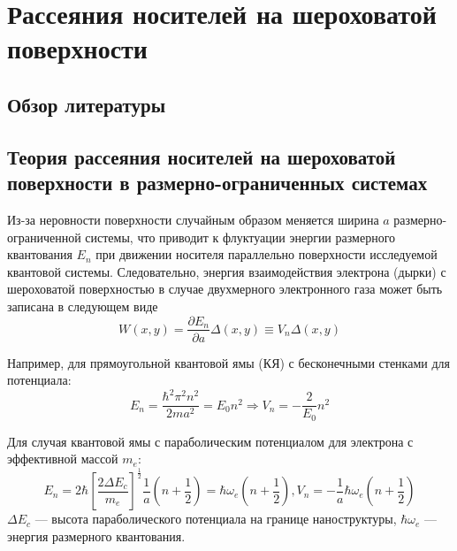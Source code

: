 \chapter{Рассеяния носителей на шероховатой поверхности} \label{chapt1}

\section{Обзор литературы} \label{sect1_1}

\section{Теория рассеяния носителей на шероховатой поверхности в размерно-ограниченных системах} \label{sect1_2}
Из-за неровности поверхности случайным образом меняется ширина $a$ размерно-ограниченной системы, что приводит к флуктуации энергии размерного квантования $E_n$ при движении носителя параллельно поверхности исследуемой квантовой системы. Следовательно, энергия взаимодействия электрона (дырки) с шероховатой поверхностью в случае двухмерного электронного газа может быть записана в следующем виде \cite{Sakaki1987}
\begin{equation}
W(x,y)=\frac{\partial E_n}{\partial a}\Delta(x,y)\equiv V_n \Delta(x,y)
\end{equation}

Например, для прямоугольной квантовой ямы (КЯ) с бесконечными стенками для потенциала:
\begin{equation}
E_n = \frac{\hbar^2 \pi^2 n^2}{2ma^2}=E_0 n^2 \Rightarrow V_n = -\frac{2}{E_0}n^2
\end{equation}

Для случая квантовой ямы с параболическим потенциалом для электрона с эффективной массой $m_e$:
\begin{equation}
E_n=2\hbar \left[ \frac{2\Delta E_c} {m_e} \right]^\frac{1}{2} \frac{1}{a}\left( n + \frac{1}{2} \right) = \hbar \omega_e \left( n + \frac{1}{2} \right), V_n = -\frac{1}{a} \hbar \omega_e \left( n + \frac{1}{2} \right)
\end{equation}
$\Delta E_c$ --- высота параболического потенциала на границе наноструктуры, $\hbar \omega_e$ --- энергия размерного квантования.

